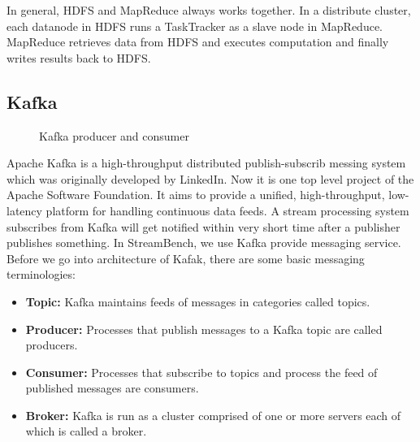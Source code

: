 In general, HDFS and MapReduce always works together. In a distribute cluster, each datanode in HDFS runs  a TaskTracker as a slave node in MapReduce. MapReduce retrieves data from HDFS and executes computation and finally writes results back to HDFS.

\subsection{Kafka}
\label{subsection:kafka}

\begin{figure}
  \begin{center}
   \caption{Kafka producer and consumer \cite{Kafka}}
   \label{fig:kafka_producer_consumer}
  \end{center}
\end{figure}

Apache Kafka is a high-throughput distributed publish-subscrib messing system which was originally developed by LinkedIn. Now it is one top level project of the Apache Software Foundation. It aims to provide a unified, high-throughput, low-latency platform for handling continuous data feeds. A stream processing system subscribes from Kafka will get notified within very short time after a publisher publishes something. In StreamBench, we use Kafka provide messaging service. Before we go into architecture of Kafak, there are some basic messaging terminologies: \cite{Kafka}

\begin{itemize}
  \item \textbf{Topic:} Kafka maintains feeds of messages in categories called topics. 
  \item \textbf{Producer:} Processes that publish messages to a Kafka topic are called producers.
  \item \textbf{Consumer:} Processes that subscribe to topics and process the feed of published messages are consumers.
   \item \textbf{Broker:} Kafka is run as a cluster comprised of one or more servers each of which is called a broker.
\end{itemize}

